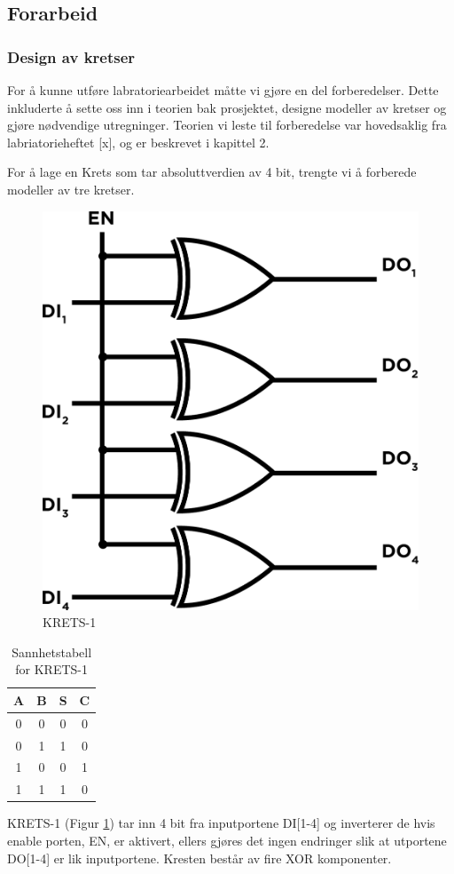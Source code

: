 \documentclass{article}
\begin{document}
\subsection{Forarbeid}
\subsubsection{Design av kretser}
For å kunne utføre labratoriearbeidet måtte vi gjøre en del forberedelser. Dette inkluderte å sette oss inn i teorien bak prosjektet, designe modeller av kretser og gjøre nødvendige utregninger. Teorien vi leste til forberedelse var hovedsaklig fra labriatorieheftet [x], og er beskrevet i kapittel 2.

For å lage en Krets som tar absoluttverdien av 4 bit, trengte vi å forberede modeller av tre kretser.
\begin{multicols}{2}
\begin{figure}[H]
	\centering
	\includegraphics[width=0.3\linewidth]{krets1}
	\caption{KRETS-1}
	\label{fig:KRETS-1}
\end{figure}

\begin{table}[h]
	\centering
	\caption{Sannhetstabell for KRETS-1}
	\label{tab:sannhet1}
	\vspace{0.2cm}
	\begin{tabular} {| c | c | c | c |} \hline
		A & B & S & C \\ \hline
		0 & 0 & 0 & 0 \\ \hline
		0 & 1 & 1 & 0 \\ \hline
		1 & 0 & 0 & 1 \\ \hline
		1 & 1 & 1 & 0 \\ \hline
	\end{tabular}
\end{table}
\end{multicols}

KRETS-1 (Figur \ref{fig:KRETS-1}) tar inn 4 bit fra inputportene DI[1-4] og inverterer de hvis enable porten, EN, er aktivert, ellers gjøres det ingen endringer slik at utportene DO[1-4] er lik inputportene. Kresten består av fire XOR komponenter.
\end{document}
